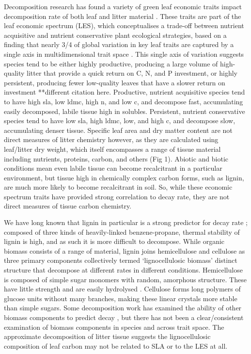 \documentclass{article}
\begin{document}
Decomposition research has found a variety of green leaf economic traits impact decomposition rate of both leaf \citetext{specific leaf area/leaf mass area and leaf nitrogen \citealp{devries2012,cornwell2008}, and leaf carbon \citealp{britson2016}} and litter material \citetext{litter carbon and dry matter content \citealp{freschet2012}}. These traits are part of the leaf economic spectrum (LES), which conceptualises a trade-off between nutrient acquisitive and nutrient conservative plant ecological strategies, based on a finding that nearly 3/4 of global variation in key leaf traits are captured by a single axis in multidimensional trait space \citep{wright2004}. This single axis of variation suggests species tend to be either highly productive, producing a large volume of high-quality litter that provide a quick return on C, N, and P investment, or highly persistent, producing fewer low-quality leaves that have a slower return on investment **different citation here. Productive, nutrient acquisitive species tend to have high sla, low ldmc, high n, and low c, and decompose fast, accumulating easily decomposed, labile tissue high in solubles. Persistent, nutrient conservative species tend to have low sla, high ldmc, low, and high c, and decompose slow, accumulating denser tissue. Specific leaf area and dry matter content are not direct measures of litter chemistry however, as they are calculated using leaf/litter dry weight, which itself encompasses a range of tissue material including nutrients, proteins, carbon, and others (Fig 1). Abiotic and biotic conditions mean even labile tissue can become recalcitrant in a particular environment, but tissue high in chemically complex carbon forms, such as lignin, are much more likely to become recalcitrant in soil. So, while these economic spectrum traits have provided strong correlation to decay rate, they are not direct measures of tissue carbon chemistry. 

We have long known that lignin in particular is a strong predictor for decay rate \citealp{britson2016,cornwell2008,makkonen2012,freschet2012a,freschet2012}; composed of three kinds of heavily-linked benzene-propane, thermal stability of lignin is high, and as such it is more difficult to decompose. While organic biomass consists of a range of material, lignin joins hemicellulose and cellulose as three primary components collectively termed `lignocellulosic biomass’ distinct structure that decompose at different rates in different conditions. Hemicellulose is composed of simple sugar monomers with random, amorphous structure. These have little strength and are easily hydrolysed \citep{muller-hagedorn2007}. Cellulose forms long polymers of glucose units without many branches, making these linear crystals more stable than simple sugars. Some decomposition work has examined the ability of other biomass components to predict decay \citetext{including cellulose \citealp{britson2016}, and a range of other organic compounds identified by infrared spectroscopy \citealp{lang2009}}, but there has not been a clear/consistent examination of biomass components in species and across trait space. The approximate decomposition of litter tissue suggests the lignocellulosic composition of leaf carbon may not be related to SLA or to the LES at all.
\end{document}
